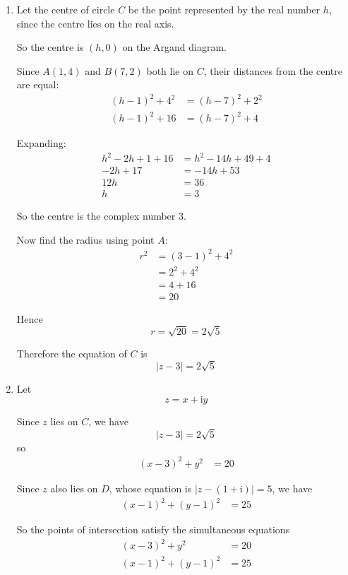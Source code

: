 \documentclass[leqno]{article}
\begin{document}
\begin{enumerate}[
  label=\textbf{\arabic*.},
  leftmargin=*,
  topsep=0pt,
  partopsep=0pt,
  parsep=0pt
]
\begin{tcolorbox}[colback=white, colframe=scarlet, title={\textbf{Solution}}, breakable, grow to left by=6mm, grow to right by=10mm]
\begin{enumerate}[label=\textbf{(\alph*)}]
  \item Let the centre of circle $C$ be the point represented by the real number $h$, since the centre lies on the real axis.

  So the centre is $(h,0)$ on the Argand diagram.

  Since $A(1,4)$ and $B(7,2)$ both lie on $C$, their distances from the centre are equal:
  \begin{align*}
  (h-1)^2+4^2&=(h-7)^2+2^2 \\
  (h-1)^2+16&=(h-7)^2+4
  \end{align*}

  Expanding:
  \begin{align*}
  h^2-2h+1+16&=h^2-14h+49+4 \\
  -2h+17&=-14h+53 \\
  12h&=36 \\
  h&=3
  \end{align*}

  So the centre is the complex number $3$.

  Now find the radius using point $A$:
  \begin{align*}
  r^2&=(3-1)^2+4^2 \\
  &=2^2+4^2 \\
  &=4+16 \\
  &=20
  \end{align*}

  Hence
  \[
  r=\sqrt{20}=2\sqrt{5}
  \]

  Therefore the equation of $C$ is
  \[
  |z-3|=2\sqrt{5}
  \]

  \item Let
  \[
  z=x+\mathrm{i}y
  \]

  Since $z$ lies on $C$, we have
  \[
  |z-3|=2\sqrt{5}
  \]
  so
  \begin{align*}
  (x-3)^2+y^2&=20
  \end{align*}

  Since $z$ also lies on $D$, whose equation is $|z-(1+\mathrm{i})|=5$, we have
  \begin{align*}
  (x-1)^2+(y-1)^2&=25
  \end{align*}

  So the points of intersection satisfy the simultaneous equations
  \begin{align*}
  (x-3)^2+y^2&=20 \\
  (x-1)^2+(y-1)^2&=25
  \end{align*}


\end{enumerate}
\end{tcolorbox}
\end{enumerate}
\end{document}

